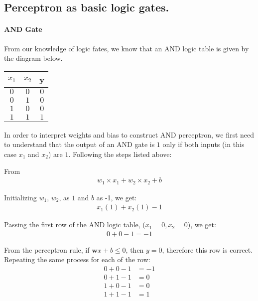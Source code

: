 \subsection{Perceptron as basic logic gates.}

\paragraph{AND Gate}
From our knowledge of logic fates, we know that an AND logic table is given by the diagram below.

\begin{flushleft}
	\begin{table}[H]
	\centering
	\begin{tabular}{|c|c|c|}
		\hline
		$x_1$ & $x_2$ & y \\
		\hline
		$0$ & $0$ & $0$   \\
		$0$ & $1$ & $0$   \\
		$1$ & $0$ & $0$   \\
		$1$ & $1$ & $1$   \\
		\hline
	\end{tabular}
\end{table}
\end{flushleft}

\hfill\linebreak
In order to interpret weights and bias to construct AND perceptron, we first need to understand that the output of an AND gate is $1$ only if both inputs (in this case $x_1$ and $x_2$) are $1$. Following the steps listed above:

From 
\begin{align}
	w_1\times x_1 + w_2\times x_2 + b
\end{align}

Initializing $w_1$, $w_2$, as $1$ and $b$ as -1, we get:
\begin{align}
	x_1(1) + x_2(1) - 1
\end{align}

Passing the first row of the AND logic table, ($x_1 = 0, x_2 = 0$), we get:
\begin{align}
	0 + 0 - 1 = -1
\end{align}

From the perceptron rule, if $\mathbf{w}x + b \leq 0$, then $y=0$, therefore this row is correct. Repeating the same process for each of the row:
\begin{align*}
	0 + 0 - 1 &= -1 \\
	0 + 1 - 1 &= 0 \\
	1 + 0 - 1 &= 0 \\
	1 + 1 - 1 &= 1 \\
\end{align*}

